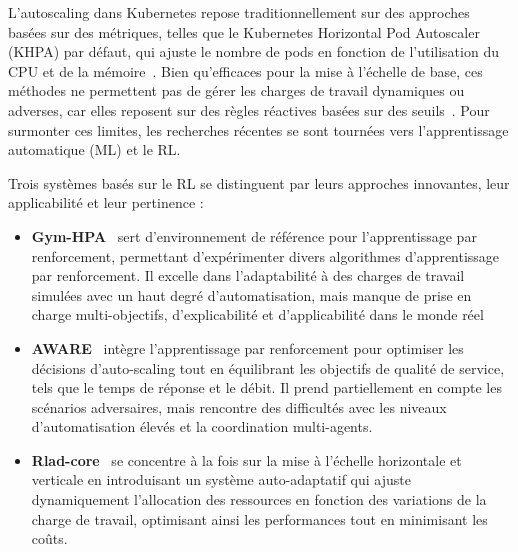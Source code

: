 \noindent L'autoscaling dans Kubernetes repose traditionnellement sur des approches basées sur des métriques, telles que le Kubernetes Horizontal Pod Autoscaler (KHPA) par défaut, qui ajuste le nombre de pods en fonction de l'utilisation du CPU et de la mémoire~\cite{Carrion2022}. Bien qu'efficaces pour la mise à l'échelle de base, ces méthodes ne permettent pas de gérer les charges de travail dynamiques ou adverses, car elles reposent sur des règles réactives basées sur des seuils~\cite{Tran2022}. Pour surmonter ces limites, les recherches récentes se sont tournées vers l'apprentissage automatique (ML) et le RL.

Trois systèmes basés sur le RL se distinguent par leurs approches innovantes, leur applicabilité et leur pertinence :
%
\begin{itemize}
    \item \textbf{Gym-HPA}~\cite{gymhpa2022} sert d'environnement de référence pour l'apprentissage par renforcement, permettant d'expérimenter divers algorithmes d'apprentissage par renforcement. Il excelle dans l'adaptabilité à des charges de travail simulées avec un haut degré d'automatisation, mais manque de prise en charge multi-objectifs, d'explicabilité et d'applicabilité dans le monde réel
    \item \textbf{AWARE}~\cite{aware2023} intègre l'apprentissage par renforcement pour optimiser les décisions d'auto-scaling tout en équilibrant les objectifs de qualité de service, tels que le temps de réponse et le débit. Il prend partiellement en compte les scénarios adversaires, mais rencontre des difficultés avec les niveaux d'automatisation élevés et la coordination multi-agents.
    \item \textbf{Rlad-core}~\cite{Rossi2019} se concentre à la fois sur la mise à l'échelle horizontale et verticale en introduisant un système auto-adaptatif qui ajuste dynamiquement l'allocation des ressources en fonction des variations de la charge de travail, optimisant ainsi les performances tout en minimisant les coûts.
\end{itemize}

